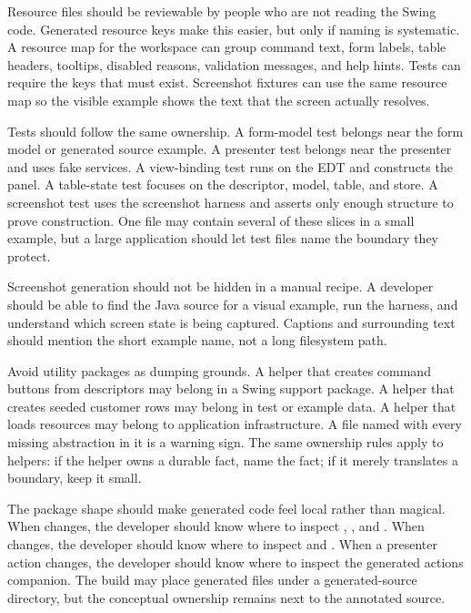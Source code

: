 Resource files should be reviewable by people who are not reading the Swing
code. Generated resource keys make this easier, but only if naming is
systematic. A resource map for the workspace can group command text, form
labels, table headers, tooltips, disabled reasons, validation messages, and
help hints. Tests can require the keys that must exist. Screenshot fixtures can
use the same resource map so the visible example shows the text that the
screen actually resolves.

Tests should follow the same ownership. A form-model test belongs near the
form model or generated source example. A presenter test belongs near the
presenter and uses fake services. A view-binding test runs on the EDT and
constructs the panel. A table-state test focuses on the descriptor, model,
table, and store. A screenshot test uses the screenshot harness and asserts
only enough structure to prove construction. One 
file may contain several of these slices in a small example, but a large
application should let test files name the boundary they protect.

Screenshot generation should not be hidden in a manual recipe. A developer
should be able to find the Java source for a visual example, run the harness,
and understand which screen state is being captured. Captions and surrounding
text should mention the short example name, not a long filesystem path.

Avoid utility packages as dumping grounds. A helper that creates command
buttons from descriptors may belong in a Swing support package. A helper that
creates seeded customer rows may belong in test or example data. A helper that
loads resources may belong to application infrastructure. A file named
 with every missing abstraction in it is a warning sign. The
same ownership rules apply to helpers: if the helper owns a durable fact,
name the fact; if it merely translates a boundary, keep it small.

The package shape should make generated code feel local rather than magical.
When  changes, the developer should know where to inspect
, , and
. When  changes, the developer
should know where to inspect  and
. When a presenter action changes, the
developer should know where to inspect the generated actions companion. The
build may place generated files under a generated-source directory, but the
conceptual ownership remains next to the annotated source.


